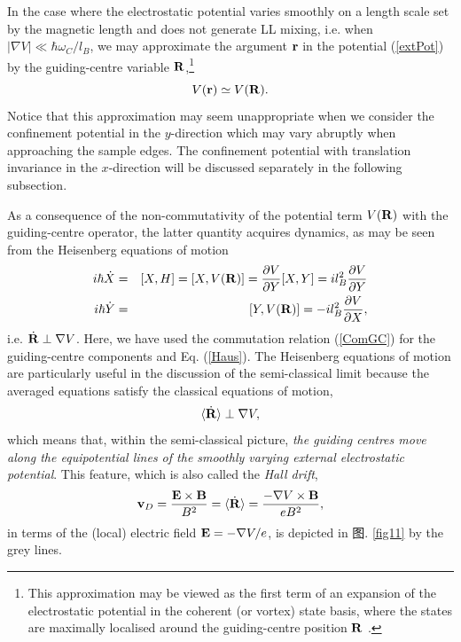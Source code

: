 \documentclass[10pt]{book}
\newcommand{\br}{{\bf r}}
\newcommand{\bR}{{\bf R}}
\newcommand{\bB}{{\bf B}}
\newcommand{\bE}{{\bf E}}
\newcommand{\beq}{\begin{equation}}
\newcommand{\beqn}{\begin{eqnarray}}
\newcommand{\eeq}{\end{equation}}
\newcommand{\eeqn}{\end{eqnarray}}
\newcommand{\nn}{\nonumber}
\begin{document}
In the case where the electrostatic potential varies smoothly on a length scale set by the magnetic length
and does not generate LL mixing, i.e. when
$|\nabla V| \ll \hbar \omega_C/l_B$, we may approximate the argument $\br$ in the potential (\ref{extPot}) 
by the guiding-centre variable $\bR$,\footnote{This approximation may be viewed as the first term of an expansion of the
electrostatic potential in the coherent (or vortex) state basis, where the states are maximally localised around the 
guiding-centre position $\bR$ \cite{champel}.} 
\beq\label{GCpotential}
V(\br)\simeq V(\bR). 
\eeq
Notice that this approximation may seem unappropriate
when we consider the confinement potential in the $y$-direction which may vary abruptly when approaching the sample edges.
The confinement potential with translation invariance in the $x$-direction will be discussed separately in the following subsection.

As a consequence of the non-commutativity of the potential term $V(\bR)$ with the guiding-centre operator, the latter 
quantity acquires dynamics, as may be seen from the Heisenberg equations of motion
\beqn\label{HeisenbergEM}
\nn
i\hbar \dot{X} &=& [X,H] = [X,V(\bR)] = \frac{\partial V}{\partial Y}[X,Y] = il_B^2 \frac{\partial V}{\partial Y}\\
i\hbar \dot{Y} &=& [Y,V(\bR)] = - il_B^2\frac{\partial V}{\partial X},
\eeqn
i.e. $\dot{\bR} \perp \nabla V$. Here, we have used the commutation relation (\ref{ComGC}) for the guiding-centre components
and Eq. (\ref{Haus}). The Heisenberg equations of motion are particularly useful in the discussion of the semi-classical limit
because the averaged equations satisfy the classical equations of motion,
\beq\label{SemCl}
\langle \dot{\bR}\rangle \perp \nabla V,
\eeq
which means that, within the semi-classical picture, {\sl the guiding centres move along the equipotential lines of the 
smoothly varying external electrostatic potential}. This feature, which is also called the {\sl Hall drift}, 
\beq\label{HallDrift}
{\bf v}_D=\frac{\bE\times\bB}{B^2} = \langle \dot{\bR}\rangle = \frac{-\nabla V \times \bB}{eB^2},
\eeq
in terms of the (local) electric field $\bE=-\nabla V/e$,
is depicted in 图. \ref{fig11} by the grey lines. 
\end{document}
